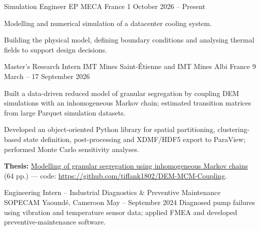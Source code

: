 \documentclass[11pt, a4paper]{awesome-cv}
\begin{document}
\begin{cventries}
  \cventry
    {Simulation Engineer}
    {EP MECA}
    {France}
    {1 October 2026 -- Present}
    {
      \begin{cvitems}
        \item Modelling and numerical simulation of a datacenter cooling system.
        \item Building the physical model, defining boundary conditions and analysing thermal fields to support design decisions.
      \end{cvitems}
    }
  \cventry
    {Master's Research Intern}
    {IMT Mines Saint-Étienne and IMT Mines Albi}
    {France}
    {9 March -- 17 September 2026}
    {
      \begin{cvitems}
        \item Built a data-driven reduced model of granular segregation by coupling DEM simulations with an inhomogeneous Markov chain; estimated transition matrices from large Parquet simulation datasets.
        \item Developed an object-oriented Python library for spatial partitioning, clustering-based state definition, post-processing and XDMF/HDF5 export to ParaView; performed Monte Carlo sensitivity analyses.
        \item \textbf{Thesis:} \href{https://tiffank1802.github.io/rapports/rapport-stage-dem-mcm.pdf}{\underline{Modelling of granular segregation using inhomogeneous Markov chains}} (64 pp.) --- code: \url{https://github.com/tiffank1802/DEM-MCM-Coupling}.
      \end{cvitems}
    }
  \cventry
    {Engineering Intern -- Industrial Diagnostics \& Preventive Maintenance}
    {SOPECAM}
    {Yaoundé, Cameroon}
    {May -- September 2024}
    {Diagnosed pump failures using vibration and temperature sensor data; applied FMEA and developed preventive-maintenance software.}
\end{cventries}
\end{document}
